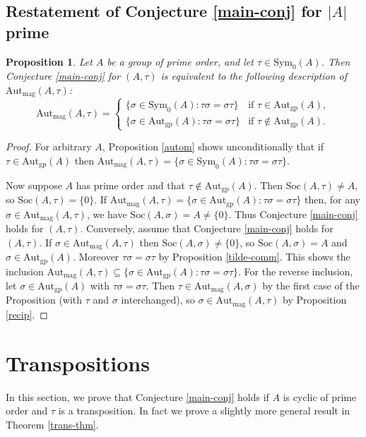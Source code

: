 \documentclass[letterpaper,12pt]{amsart}
\numberwithin{equation}{section}
\numberwithin{algorithm}{section}
\newtheorem{proposition}[lemma]{Proposition}
\theoremstyle{definition}
\newcommand{\Soc}{\mathrm{Soc}}
\newcommand{\Autgp}{\mathrm{Aut}_{\mathrm{gp}}}
\newcommand{\Autmag}{\mathrm{Aut}_\mathrm{mag}}
\newcommand{\Symo}{\mathrm{Sym}_0}
\begin{document}
\subsection{Restatement of Conjecture \ref{main-conj} for $|A|$ prime}

\begin{proposition}
Let $A$ be a group of prime order, and let $\tau \in \Symo(A)$. Then Conjecture \ref{main-conj} for $(A,\tau)$ is equivalent to the following description of $\Autmag(A,\tau)$:
$$ \Autmag(A,\tau) = \begin{cases}
 \{\sigma \in \Symo(A) : \tau \sigma = \sigma \tau\} & \mbox{if } \tau \in \Autgp(A), \\
 \{\sigma \in \Autgp(A) : \tau \sigma = \sigma \tau\} & \mbox{if } \tau \not \in \Autgp(A).
\end{cases} $$
\end{proposition}
\begin{proof}
For arbitrary $A$, Proposition \ref{autom} shows unconditionally that if $\tau \in \Autgp(A)$ then $\Autmag(A,\tau) = \{\sigma \in \Symo(A) : \tau \sigma = \sigma \tau\}$.

Now suppose $A$ has prime order and that $\tau \not \in \Autgp(A)$. Then $\Soc(A,\tau) \neq A$, so $\Soc(A,\tau)=\{0\}$. If 
$\Autmag(A,\tau) = \{\sigma \in \Autgp(A) : \tau \sigma = \sigma \tau\}$ then, for any $\sigma \in \Autmag(A,\tau)$, we have  $\Soc(A,\sigma)=A \neq \{0\}$. Thus Conjecture \ref{main-conj} holds for $(A,\tau)$. Conversely, assume that Conjecture \ref{main-conj} holds for $(A,\tau)$. If $\sigma \in \Autmag(A,\tau)$ then $\Soc(A,\sigma) \neq \{0\}$, so $\Soc(A,\sigma)=A$ and $\sigma \in \Autgp(A)$. Moreover $\tau \sigma = \sigma \tau$ by Proposition \ref{tilde-comm}. This shows the inclusion $\Autmag(A,\tau) \subseteq  \{\sigma \in \Autgp(A) : \tau \sigma = \sigma \tau\}$. For the reverse inclusion, let $\sigma \in \Autgp(A)$ with $\tau \sigma =\sigma \tau$. Then $\tau \in \Autmag(A,\sigma)$ by the first case of the Proposition (with $\tau$ and $\sigma$ interchanged), so $\sigma \in \Autmag(A,\tau)$ by Proposition \ref{recip}. 
\end{proof}
 	
\section{Transpositions}

In this section, we prove that Conjecture \ref{main-conj} holds if $A$ is cyclic of prime order and $\tau$ is a transposition. In fact we prove a slightly more general result in Theorem \ref{trans-thm}. 
\end{document}

